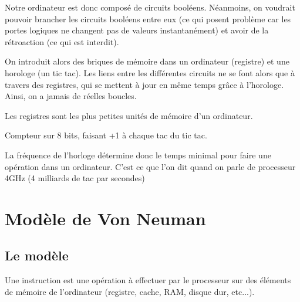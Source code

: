 Notre ordinateur est donc composé de circuits booléens. Néanmoins, on voudrait pouvoir brancher les circuits booléens entre eux (ce qui posent problème car les portes logiques ne changent pas de valeurs instantanément) et avoir de la rétroaction (ce qui est interdit).

\begin{idee}
	On introduit alors des briques de mémoire dans un ordinateur (registre) et une horologe (un tic tac). Les liens entre les différentes circuits ne se font alors que à travers des registres, qui se mettent à jour en même temps grâce à l'horologe. Ainsi, on a jamais de réelles boucles.
\end{idee}

\begin{rem}
	Les registres sont les plus petites unités de mémoire d'un ordinateur.
\end{rem}

\begin{example}
	Compteur sur 8 bits, faisant +1 à chaque tac du tic tac. 
\end{example}

\begin{rem}
	La fréquence de l'horloge détermine donc le temps minimal pour faire une opération dans un ordinateur. C'est ce que l'on dit quand on parle de processeur 4GHz (4 milliards de tac par secondes)
\end{rem}

\section{Modèle de Von Neuman}

\subsection{Le modèle}

\begin{definition}
	Une instruction est une opération à effectuer par le processeur sur des éléments de mémoire de l'ordinateur (registre, cache, RAM, disque dur, etc...).
\end{definition}

